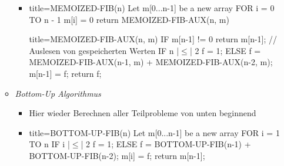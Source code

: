 \documentclass[
    12pt,
    a4paper,
    ngerman,
    color=3b,%
    marginpar=false,
    colorback=false,
    leqno,
]{tudaexercise}
\begin{document}
\begin{itemize}
\begin{itemize}
\begin{itemize}
                        \item[]
                            \begin{ccode}[autogobble,escapeinside=||]{title={MEMOIZED-FIB(n)}}
                            Let m[0...n-1] be a new array
                            FOR i = 0 TO n - 1
                                m[i] = 0
                            return MEMOIZED-FIB-AUX(n, m)
                            \end{ccode}
                            \begin{ccode}[autogobble,escapeinside=||]{title={MEMOIZED-FIB-AUX(n, m)}}
                            IF m[n-1] != 0
                                return m[n-1];      // Auslesen von gespeicherten Werten
                            IF n |$\leq$| 2
                                f = 1;
                            ELSE
                                f = MEMOIZED-FIB-AUX(n-1, m) + MEMOIZED-FIB-AUX(n-2, m);
                            m[n-1] = f;
                            return f;
                            \end{ccode}
                    \end{itemize}
                \item \textit{Bottom-Up Algorithmus}
                    \begin{itemize}
                        \item Hier wieder Berechnen aller Teilprobleme von unten beginnend
                        \item[]
                            \begin{ccode}[autogobble,escapeinside=||]{title={BOTTOM-UP-FIB(n)}}
                            Let m[0...n-1] be a new array
                            FOR i = 1 TO n
                                IF i |$\leq$| 2
                                    f = 1;
                                ELSE
                                    f = BOTTOM-UP-FIB(n-1) + BOTTOM-UP-FIB(n-2);
                                m[i] = f;
                            return m[n-1];
                            \end{ccode}
                    \end{itemize}
            \end{itemize}
    \end{itemize}
\clearpage
\end{document}
